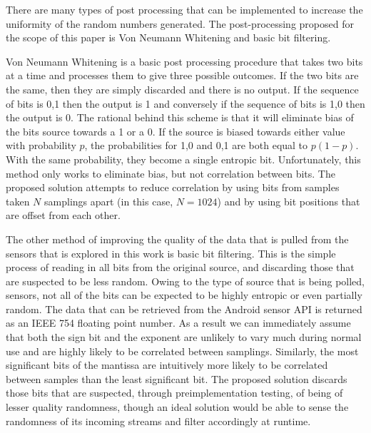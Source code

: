 

There are many types of post processing that can be implemented to increase the
uniformity of the random numbers generated. The post-processing proposed for the
scope of this paper is Von Neumann Whitening \cite{vn_whitening} and basic bit
filtering. 

Von Neumann Whitening is a basic post processing procedure that takes two bits
at a time and processes them to give three possible outcomes. If the two bits
are the same, then they are simply discarded and there is no output. If the
sequence of bits is 0,1 then the output is 1 and conversely if the sequence of
bits is 1,0 then the output is 0. The rational behind this scheme is that it
will eliminate bias of the bits source towards a 1 or a 0. If the source is
biased towards either value with probability $p$, the probabilities for 1,0
and 0,1 are both equal to $p(1-p)$. With the same probability, they become a
single entropic bit. Unfortunately, this method only works to eliminate bias,
but not correlation between bits. The proposed solution attempts to reduce
correlation by using bits from samples taken $N$ samplings apart (in this case,
$N = 1024$) and by using bit positions that are offset from each other. 

The other method of improving the quality of the data that is pulled from the
sensors that is explored in this work is basic bit filtering. This is the simple
process of reading in all bits from the original source, and discarding those
that are suspected to be less random. Owing to the type of source that is being
polled, sensors, not all of the bits can be expected to be highly entropic or
even partially random. The data that can be retrieved from the Android sensor
API is returned as an IEEE 754 floating point number. As a result we can
immediately assume that both the sign bit and the exponent are unlikely to vary
much during normal use and are highly likely to be correlated between samplings.
Similarly, the most significant bits of the mantissa are intuitively more likely
to be correlated between samples than the least significant bit. The proposed
solution discards those bits that are suspected, through preimplementation
testing, of being of lesser quality randomness, though an ideal solution would
be able to sense the randomness of its incoming streams and filter accordingly
at runtime.
